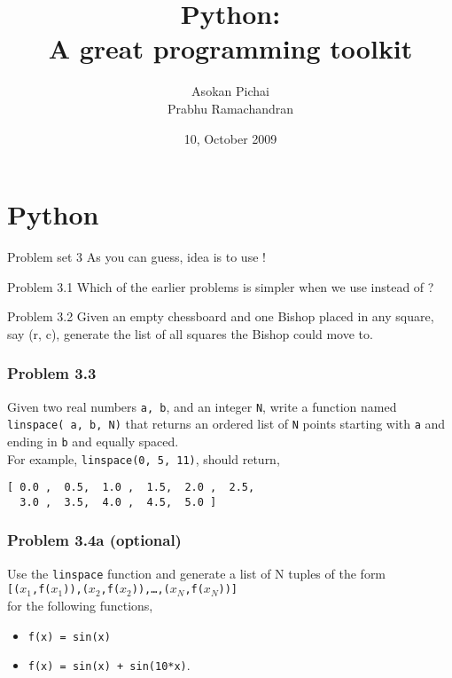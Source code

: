 \documentclass[14pt,compress]{beamer}
\title[Basic Python]{Python:\\A great programming toolkit}
\author[Asokan \& Prabhu] {Asokan Pichai\\Prabhu Ramachandran}
\institute[IIT Bombay] {Department of Aerospace Engineering\\IIT Bombay}
\date[] {10, October 2009}
\newcommand{\typ}[1]{\texttt{#1}}
\newcommand{\kwrd}[1]{ \texttt{\textbf{\color{blue}{#1}}}  }
\begin{document}
\begin{frame}
  \titlepage
\end{frame}

\section{Python}

\begin{frame}
  {Problem set 3}
  As you can guess, idea is to use \kwrd{for}!
\end{frame}

\begin{frame}{Problem 3.1}
  Which of the earlier problems is simpler when we use \kwrd{for} instead of \kwrd{while}? 
\end{frame}

\begin{frame}{Problem 3.2}
  Given an empty chessboard and one Bishop placed in any square, say (r, c), generate the list of all squares the Bishop could move to.
\end{frame}

\begin{frame}[fragile]
  \frametitle{Problem 3.3}

  Given two real numbers \typ{a, b}, and an integer \typ{N}, write a
  function named \typ{linspace( a, b, N)} that returns an ordered list
  of \typ{N} points starting with \typ{a} and ending in \typ{b} and
  equally spaced.\\

  For example, \typ{linspace(0, 5, 11)}, should return, \\
\begin{lstlisting}
[ 0.0 ,  0.5,  1.0 ,  1.5,  2.0 ,  2.5,  
  3.0 ,  3.5,  4.0 ,  4.5,  5.0 ]
\end{lstlisting}
\end{frame}

\begin{frame}[fragile]
  \frametitle{Problem 3.4a (optional)}

Use the \typ{linspace} function and generate a list of N tuples of the form\\
\typ{[($x_1$,f($x_1$)),($x_2$,f($x_2$)),\ldots,($x_N$,f($x_N$))]}\\for the following functions,\begin{itemize}
  \item \typ{f(x) = sin(x)}
  \item \typ{f(x) = sin(x) + sin(10*x)}.
\end{itemize}
\end{frame}
\end{document}
